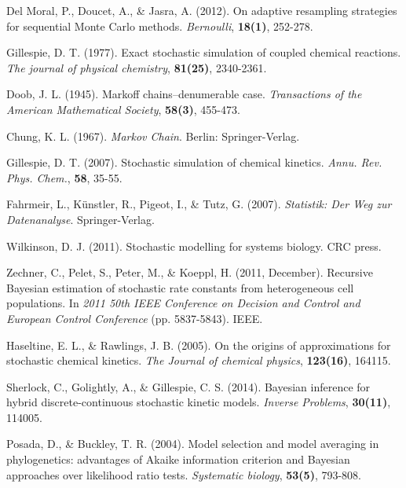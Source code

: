 \documentclass{bioinfo}
\begin{document}
\begin{thebibliography}{}
Del Moral, P., Doucet, A., \& Jasra, A. (2012). On adaptive resampling strategies for sequential Monte Carlo methods. \textit{Bernoulli}, \textbf{18(1)}, 252-278.

Gillespie, D. T. (1977). Exact stochastic simulation of coupled chemical reactions. \textit{The journal of physical chemistry}, \textbf{81(25)}, 2340-2361.

Doob, J. L. (1945). Markoff chains--denumerable case. \textit{Transactions of the American Mathematical Society}, \textbf{58(3)}, 455-473.

Chung, K. L. (1967). \textit{Markov Chain}. Berlin: Springer-Verlag.

Gillespie, D. T. (2007). Stochastic simulation of chemical kinetics. \textit{Annu. Rev. Phys. Chem.}, \textbf{58}, 35-55.

Fahrmeir, L., K\"unstler, R., Pigeot, I., \& Tutz, G. (2007). \textit{Statistik: Der Weg zur Datenanalyse}. Springer-Verlag.

Wilkinson, D. J. (2011). Stochastic modelling for systems biology. CRC press.

Zechner, C., Pelet, S., Peter, M., \& Koeppl, H. (2011, December). Recursive Bayesian estimation of stochastic rate constants from heterogeneous cell populations. In \textit{2011 50th IEEE Conference on Decision and Control and European Control Conference} (pp. 5837-5843). IEEE.

Haseltine, E. L., \& Rawlings, J. B. (2005). On the origins of approximations for stochastic chemical kinetics. \textit{The Journal of chemical physics}, \textbf{123(16)}, 164115.

Sherlock, C., Golightly, A., \& Gillespie, C. S. (2014). Bayesian inference for hybrid discrete-continuous stochastic kinetic models. \textit{Inverse Problems}, \textbf{30(11)}, 114005.

Posada, D., \& Buckley, T. R. (2004). Model selection and model averaging in phylogenetics: advantages of Akaike information criterion and Bayesian approaches over likelihood ratio tests. \textit{Systematic biology}, \textbf{53(5)}, 793-808.


\end{thebibliography}
\end{document}
